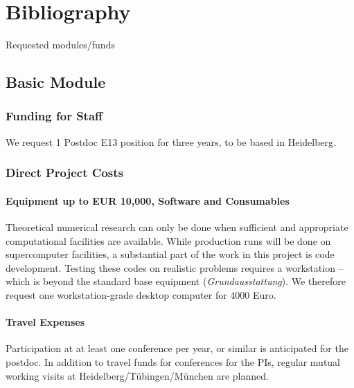 \documentclass[10pt,fleqn,twoside]{article}
\begin{document}
\section{Bibliography}

\begingroup
\renewcommand{\section}[2]{}%


\endgroup


\section{Requested modules/funds}
\renewcommand{\leftmark}{\sc Requested modules/funds}
%
\subsection{Basic Module}
%
\subsubsection{Funding for Staff}
%
We request 1 Postdoc E13 position for three years, to be based in Heidelberg.

\subsubsection{Direct Project Costs}

\paragraph{Equipment up to EUR 10,000, Software and Consumables}
Theoretical numerical research can only be done when sufficient and
appropriate computational facilities are available. While production runs
will be done on supercomputer facilities, a substantial part of the work in
this project is code development. Testing these codes on realistic problems
requires a workstation -- which is beyond the standard base equipment
(\textit{Grundausstattung}). We therefore request one workstation-grade
desktop computer for 4000 Euro.

\paragraph{Travel Expenses}
Participation at at least one conference per year, or similar is anticipated
for the postdoc. In addition to travel funds for conferences for the PIs,
regular mutual working visits at Heidelberg/T\"ubingen/M\"unchen are
planned.
\end{document}
